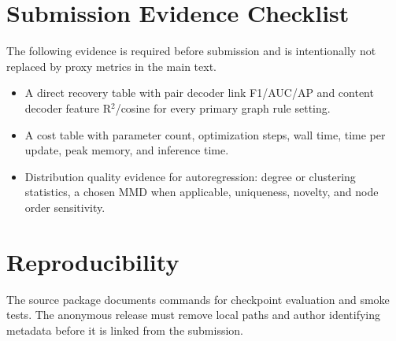 \section{Submission Evidence Checklist}
\label{app:checklist}

The following evidence is required before submission and is intentionally not
replaced by proxy metrics in the main text.
\begin{itemize}
  \item A direct recovery table with pair decoder link F1/AUC/AP and content
  decoder feature R$^2$/cosine for every primary graph rule setting.
  \item A cost table with parameter count, optimization steps, wall time,
  time per update, peak memory, and inference time.
  \item Distribution quality evidence for autoregression: degree or clustering
  statistics, a chosen MMD when applicable, uniqueness, novelty, and
  node order sensitivity.
\end{itemize}

\section{Reproducibility}
The source package documents commands for checkpoint evaluation and smoke tests.
The anonymous release must remove local paths and author identifying metadata
before it is linked from the submission.
